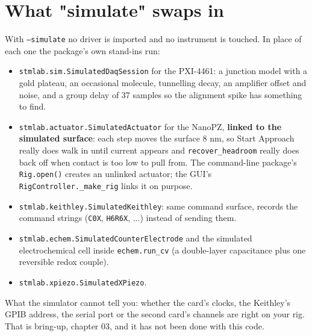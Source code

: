 \section{What "simulate" swaps in}

With \texttt{--simulate} no driver is imported and no instrument is touched. In place of each one the package's own stand-ins run:

\begin{itemize}[leftmargin=*]
\item \texttt{stmlab.\discretionary{}{}{}sim.\discretionary{}{}{}Simulated\discretionary{}{}{}Daq\discretionary{}{}{}Session} for the PXI-4461: a junction model with a gold plateau, an occasional molecule, tunnelling decay, an amplifier offset and noise, and a group delay of 37 samples so the alignment spike has something to find.
\item \texttt{stmlab.\discretionary{}{}{}actuator.\discretionary{}{}{}Simulated\discretionary{}{}{}Actuator} for the NanoPZ, \textbf{linked to the simulated surface}: each step moves the surface 8 nm, so Start Approach really does walk in until current appears and \texttt{recover\_\discretionary{}{}{}headroom} really does back off when contact is too low to pull from. The command-line package's \texttt{Rig.\discretionary{}{}{}open()} creates an unlinked actuator; the GUI's \texttt{Rig\discretionary{}{}{}Controller.\discretionary{}{}{}\_\discretionary{}{}{}make\_\discretionary{}{}{}rig} links it on purpose.
\item \texttt{stmlab.\discretionary{}{}{}keithley.\discretionary{}{}{}Simulated\discretionary{}{}{}Keithley}: same command surface, records the command strings (\texttt{C0X}, \texttt{H6R6X}, ...) instead of sending them.
\item \texttt{stmlab.\discretionary{}{}{}echem.\discretionary{}{}{}Simulated\discretionary{}{}{}Counter\discretionary{}{}{}Electrode} and the simulated electrochemical cell inside \texttt{echem.\discretionary{}{}{}run\_\discretionary{}{}{}cv} (a double-layer capacitance plus one reversible redox couple).
\item \texttt{stmlab.\discretionary{}{}{}xpiezo.\discretionary{}{}{}Simulated\discretionary{}{}{}XPiezo}.
\end{itemize}

What the simulator cannot tell you: whether the card's clocks, the Keithley's GPIB address, the serial port or the second card's channels are right on your rig. That is bring-up, chapter 03, and it has not been done with this code.

